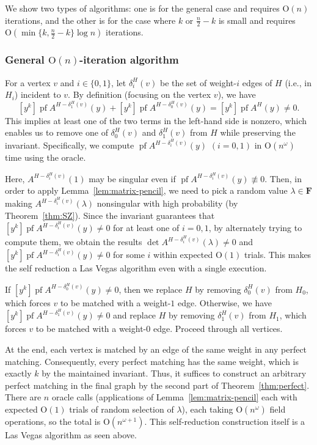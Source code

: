 \documentclass[11pt, a4paper]{article}
\theoremstyle{plain}
\theoremstyle{definition}
\theoremstyle{remark}
\newcommand{\bF}{\mathbf{F}}
\DeclareMathOperator{\pf}{pf}
\begin{document}
We show two types of algorithms:
one is for the general case and requires $\mathrm{O}(n)$ iterations, and the other is for the case where $k$ or $\frac{n}{2} - k$ is small and requires $\mathrm{O}(\min\{k, \frac{n}{2} - k\} \log n)$ iterations.



\subsubsection{General $\mathrm{O}(n)$-iteration algorithm}\label{sec:self-reduction_general}
For a vertex $v$ and $i \in \{0, 1\}$, let $\delta_i^H(v)$ be the set of weight-$i$ edges of $H$ (i.e., in $H_i$) incident to $v$.
By definition (focusing on the vertex $v$), we have
\[[y^k]\pf A^{H - \delta_1^H(v)}(y) +  [y^k]\pf A^{H - \delta_0^H(v)}(y) = [y^k]\pf A^{H}(y) \neq 0.\]
This implies at least one of the two terms in the left-hand side is nonzero, which enables us to remove one of $\delta_0^H(v)$ and $\delta_1^H(v)$ from $H$ while preserving the invariant.
Specifically, we compute $\pf A^{H - \delta_i^H(v)}(y)$ $(i = 0, 1)$ in $\mathrm{O}(n^\omega)$ time using the oracle.

Here, $A^{H - \delta_i^H(v)}(1)$ may be singular even if $\pf A^{H - \delta_i^H(v)}(y) \not\equiv 0$.
Then, in order to apply Lemma~\ref{lem:matrix-pencil}, we need to pick a random value $\lambda \in \bF$ making $A^{H - \delta_i^H(v)}(\lambda)$ nonsingular with high probability (by Theorem~\ref{thm:SZ}).
Since the invariant guarantees that $[y^k]\pf A^{H - \delta_i^H(v)}(y) \neq 0$ for at least one of $i = 0, 1$, by alternately trying to compute them, we obtain the results $\det A^{H - \delta_i^H(v)}(\lambda) \neq 0$ and $[y^k]\pf A^{H - \delta_i^H(v)}(y) \neq 0$ for some $i$ within expected $\mathrm{O}(1)$ trials.
This makes the self reduction a Las Vegas algorithm even with a single execution.

If $[y^k]\pf A^{H - \delta_0^H(v)}(y) \neq 0$, then we replace $H$ by removing $\delta_0^H(v)$ from $H_0$, which forces $v$ to be matched with a weight-$1$ edge.
Otherwise, we have $[y^k]\pf A^{H - \delta_1^H(v)}(y) \neq 0$ and replace $H$ by removing $\delta_1^H(v)$ from $H_1$, which forces $v$ to be matched with a weight-$0$ edge.
Proceed through all vertices.

At the end, each vertex is matched by an edge of the same weight in any perfect matching.
Consequently, every perfect matching has the same weight, which is exactly $k$ by the maintained invariant.
Thus, it suffices to construct an arbitrary perfect matching in the final graph by the second part of Theorem~\ref{thm:perfect}.
There are $n$ oracle calls (applications of Lemma~\ref{lem:matrix-pencil} each with expected $\mathrm{O}(1)$ trials of random selection of $\lambda$), each taking $\mathrm{O}(n^\omega)$ field operations, so the total is $\mathrm{O}(n^{\omega+1})$.
This self-reduction construction itself is a Las Vegas algorithm as seen above.
\end{document}
